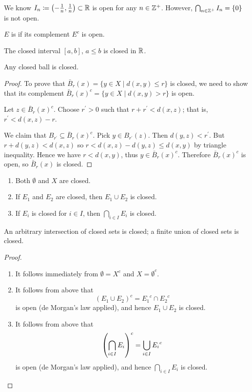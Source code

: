 \begin{example}
We know $I_n\coloneqq\left(-\frac{1}{n},\frac{1}{n}\right)\subset\mathbb R$ is open for any $n\in\mathbb Z^+$. However, $\bigcap_{n\in\mathbb Z^+}I_n=\{0\}$ is not open.
\end{example}

\begin{definition}
$E$ is  if its complement $E^c$ is open.
\end{definition}

\begin{example}
The closed interval $[a,b]$, $a\le b$ is closed in $\mathbb R$.
\end{example}

\begin{proposition}
Any closed ball is closed.
\end{proposition}

\begin{proof}
To prove that $\bar{B}_r(x)=\{y\in X\mid d(x,y)\le r\}$ is closed, we need to show that its complement $\bar{B}_r(x)^c=\{y\in X\mid d(x,y)>r\}$ is open.

Let $z\in\bar{B}_r(x)^c$. Choose $r^\prime>0$ such that $r+r^\prime<d(x,z)$; that is, $r^\prime<d(x,z)-r$.

We claim that $B_{r^\prime}\subseteq\bar{B}_r(x)^c$. Pick $y\in B_{r^\prime}(z)$. Then $d(y,z)<r^\prime$. But $r+d(y,z)<d(x,z)$ so $r<d(x,z)-d(y,z)\le d(x,y)$ by triangle inequality. Hence we have $r<d(x,y)$, thus $y\in\bar{B}_r(x)^c$. Therefore $\bar{B}_r(x)^c$ is open, so $\bar{B}_r(x)$ is closed.
\end{proof}

\begin{proposition}
\begin{enumerate}[label=(\arabic*)]
\item Both $\emptyset$ and $X$ are closed.
\item If $E_1$ and $E_2$ are closed, then $E_1\cup E_2$ is closed.
\item If $E_i$ is closed for $i\in I$, then $\bigcap_{i\in I}E_i$ is closed.
\end{enumerate}
\end{proposition}

An arbitrary intersection of closed sets is closed; a finite union of closed sets is closed.

\begin{proof} \
\begin{enumerate}[label=(\arabic*)]
\item It follows immediately from $\emptyset=X^c$ and $X=\emptyset^c$.
\item It follows from above that
\[ (E_1\cup E_2)^c={E_1}^c\cap {E_2}^c \]
is open (de Morgan's law applied), and hence $E_1\cup E_2$ is closed.
\item It follows from above that
\[ \left(\bigcap_{i\in I}E_i\right)^c=\bigcup_{i\in I}{E_i}^c \]
is open (de Morgan's law applied), and hence $\bigcap_{i\in I}E_i$ is closed.
\end{enumerate}
\end{proof}

